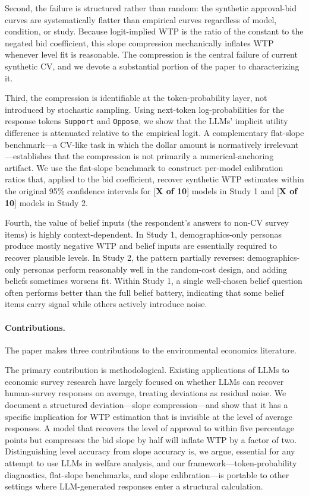 \documentclass[12pt]{article}
\begin{document}
Second, the failure is structured rather than random: the synthetic approval-bid curves are systematically flatter than empirical curves regardless of model, condition, or study. Because logit-implied WTP is the ratio of the constant to the negated bid coefficient, this slope compression mechanically inflates WTP whenever level fit is reasonable. The compression is the central failure of current synthetic CV, and we devote a substantial portion of the paper to characterizing it.

Third, the compression is identifiable at the token-probability layer, not introduced by stochastic sampling. Using next-token log-probabilities for the response tokens \texttt{Support} and \texttt{Oppose}, we show that the LLMs' implicit utility difference is attenuated relative to the empirical logit. A complementary flat-slope benchmark---a CV-like task in which the dollar amount is normatively irrelevant---establishes that the compression is not primarily a numerical-anchoring artifact. We use the flat-slope benchmark to construct per-model calibration ratios that, applied to the bid coefficient, recover synthetic WTP estimates within the original 95\% confidence intervals for [\textbf{X of 10}] models in Study 1 and [\textbf{X of 10}] models in Study 2.

Fourth, the value of belief inputs (the respondent's answers to non-CV survey items) is highly context-dependent. In Study 1, demographics-only personas produce mostly negative WTP and belief inputs are essentially required to recover plausible levels. In Study 2, the pattern partially reverses: demographics-only personas perform reasonably well in the random-cost design, and adding beliefs sometimes worsens fit. Within Study 1, a single well-chosen belief question often performs better than the full belief battery, indicating that some belief items carry signal while others actively introduce noise.

\paragraph{Contributions.} The paper makes three contributions to the environmental economics literature.

The primary contribution is methodological. Existing applications of LLMs to economic survey research \parencite{Brand2024, Horton2023, Aher2023} have largely focused on whether LLMs can recover human-survey responses on average, treating deviations as residual noise. We document a structured deviation---slope compression---and show that it has a specific implication for WTP estimation that is invisible at the level of average responses. A model that recovers the level of approval to within five percentage points but compresses the bid slope by half will inflate WTP by a factor of two. Distinguishing level accuracy from slope accuracy is, we argue, essential for any attempt to use LLMs in welfare analysis, and our framework---token-probability diagnostics, flat-slope benchmarks, and slope calibration---is portable to other settings where LLM-generated responses enter a structural calculation.
\end{document}
